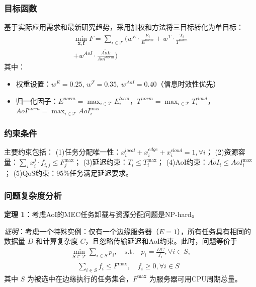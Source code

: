\documentclass[conference]{IEEEtran}
\begin{document}
\subsubsection{目标函数}
基于实际应用需求和最新研究趋势，采用加权和方法将三目标转化为单目标：
\begin{equation}
    \begin{split}
        \min_{\mathbf{x}, \mathbf{f}} F = \sum_{i \in \mathcal{T}} ( w^E \cdot \frac{E_i}{E^{norm}} + w^T \cdot \frac{T_i}{T^{norm}}
        \\+ w^{AoI} \cdot \frac{\overline{AoI}_i}{AoI^{norm}} )
    \end{split}
\end{equation}
其中：
\begin{itemize}
    \item 权重设置：$w^E = 0.25$, $w^T = 0.35$, $w^{AoI} = 0.40$（信息时效性优先）
    \item 归一化因子：$E^{norm} = \max_{i \in \mathcal{T}} E_i^{local}$，$T^{norm} = \max_{i \in \mathcal{T}} T_i^{cloud}$，$AoI^{norm} = \max_{i \in \mathcal{T}} AoI_i^{\max}$
\end{itemize}

\subsubsection{约束条件}
主要约束包括：
(1)任务分配唯一性：$x_{i}^{local} + x_{i}^{edge} + x_{i}^{cloud} = 1, \forall i$；
(2)资源容量：$\sum_{i} x_{i}^{j} \cdot f_{i,j} \leq F_{j}^{\max}$；
(3)延迟约束：$T_i \leq T_i^{\max}$；
(4)AoI约束：$\overline{AoI}_i \leq AoI_i^{\max}$；
(5)QoS约束：95\%任务满足延迟要求。

\subsubsection{问题复杂度分析}
\textbf{定理 1}：考虑AoI的MEC任务卸载与资源分配问题是NP-hard。

\textit{证明}：考虑一个特殊实例：仅有一个边缘服务器（$E = 1$），所有任务具有相同的数据量 $D$ 和计算复杂度 $C$，且忽略传输延迟和AoI约束。此时，问题等价于
\begin{equation}
    \begin{split}
        \min_{S \subseteq \mathcal{T}} \sum_{i \in S} p_i, \quad
        \text{s.t.} \quad p_i = \frac{DC}{f_i}, \forall i \in S, \\
        \quad
        \sum_{i \in S} f_i \leq F^{\max}, \quad
        f_i \geq 0, \forall i \in S
    \end{split}
\end{equation}
其中 $S$ 为被选中在边缘执行的任务集合，$F^{\max}$ 为服务器可用CPU周期总量。
\end{document}
